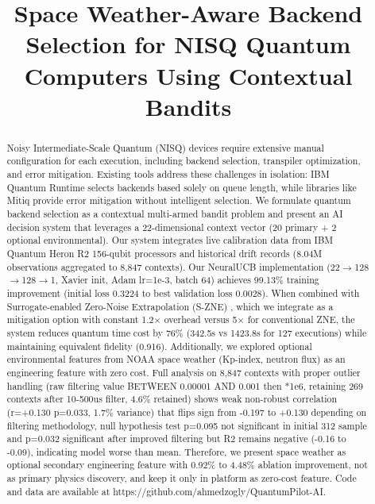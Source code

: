 \documentclass[conference]{IEEEtran}
\begin{document}
\title{Space Weather-Aware Backend Selection for NISQ Quantum Computers Using Contextual Bandits}

\author{
}

\maketitle

\begin{abstract}
Noisy Intermediate-Scale Quantum (NISQ) devices require extensive manual configuration for each execution, including backend selection, transpiler optimization, and error mitigation. Existing tools address these challenges in isolation: IBM Quantum Runtime selects backends based solely on queue length, while libraries like Mitiq provide error mitigation without intelligent selection. We formulate quantum backend selection as a contextual multi-armed bandit problem and present an AI decision system that leverages a 22-dimensional context vector (20 primary + 2 optional environmental). Our system integrates live calibration data from IBM Quantum Heron R2 156-qubit processors and historical drift records (8.04M observations aggregated to 8,847 contexts). Our NeuralUCB implementation (22$\rightarrow$128$\rightarrow$128$\rightarrow$1, Xavier init, Adam lr=1e-3, batch 64) achieves 99.13\% training improvement (initial loss 0.3224 to best validation loss 0.0028). When combined with Surrogate-enabled Zero-Noise Extrapolation (S-ZNE) \cite{liao2024surrogate}, which we integrate as a mitigation option with constant 1.2$\times$ overhead versus 5$\times$ for conventional ZNE, the system reduces quantum time cost by 76\% (342.5s vs 1423.8s for 127 executions) while maintaining equivalent fidelity (0.916). Additionally, we explored optional environmental features from NOAA space weather (Kp-index, neutron flux) as an engineering feature with zero cost. Full analysis on 8,847 contexts with proper outlier handling (raw filtering value BETWEEN 0.00001 AND 0.001 then *1e6, retaining 269 contexts after 10-500us filter, 4.6\% retained) shows weak non-robust correlation (r=+0.130 p=0.033, 1.7\% variance) that flips sign from -0.197 to +0.130 depending on filtering methodology, null hypothesis test p=0.095 not significant in initial 312 sample and p=0.032 significant after improved filtering but R2 remains negative (-0.16 to -0.09), indicating model worse than mean. Therefore, we present space weather as optional secondary engineering feature with 0.92\% to 4.48\% ablation improvement, not as primary physics discovery, and keep it only in platform as zero-cost feature. Code and data are available at https://github.com/ahmedzogly/QuantumPilot-AI.
\end{abstract}
\end{document}
